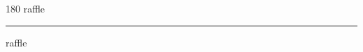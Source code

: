 
\begin{frame}
\begin{center}
\begin{turn}{180}
{\fontsize{2.5cm}{1em}\selectfont raffle}
\end{turn}
\vspace{1em}\par  
\hrule
\vspace{1em}\par  
{\fontsize{2.5cm}{1em}\selectfont raffle}
\end{center}
\end{frame}
